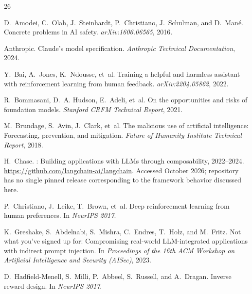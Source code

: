 \documentclass[11pt,a4paper]{article}
\begin{document}

\begin{thebibliography}{26}

D.~Amodei, C.~Olah, J.~Steinhardt, P.~Christiano, J.~Schulman, and D.~Man\'e.
\newblock Concrete problems in {AI} safety.
\newblock \textit{arXiv:1606.06565}, 2016.

Anthropic.
\newblock Claude's model specification.
\newblock \textit{Anthropic Technical Documentation}, 2024.

Y.~Bai, A.~Jones, K.~Ndousse, et~al.
\newblock Training a helpful and harmless assistant with reinforcement learning from human feedback.
\newblock \textit{arXiv:2204.05862}, 2022.

R.~Bommasani, D.~A. Hudson, E.~Adeli, et~al.
\newblock On the opportunities and risks of foundation models.
\newblock \textit{Stanford CRFM Technical Report}, 2021.

M.~Brundage, S.~Avin, J.~Clark, et~al.
\newblock The malicious use of artificial intelligence: Forecasting, prevention, and mitigation.
\newblock \textit{Future of Humanity Institute Technical Report}, 2018.

H.~Chase.
: Building applications with {LLM}s through composability, 2022--2024.
\newblock \url{https://github.com/langchain-ai/langchain}. Accessed October 2026; repository has
  no single pinned release corresponding to the framework behavior discussed here.

P.~Christiano, J.~Leike, T.~Brown, et~al.
\newblock Deep reinforcement learning from human preferences.
\newblock In \textit{NeurIPS 2017}.

K.~Greshake, S.~Abdelnabi, S.~Mishra, C.~Endres, T.~Holz, and M.~Fritz.
\newblock Not what you've signed up for: Compromising real-world {LLM}-integrated applications
  with indirect prompt injection.
\newblock In \textit{Proceedings of the 16th ACM Workshop on Artificial Intelligence and Security
  (AISec)}, 2023.

D.~Hadfield-Menell, S.~Milli, P.~Abbeel, S.~Russell, and A.~Dragan.
\newblock Inverse reward design.
\newblock In \textit{NeurIPS 2017}.


\end{thebibliography}
\end{document}
